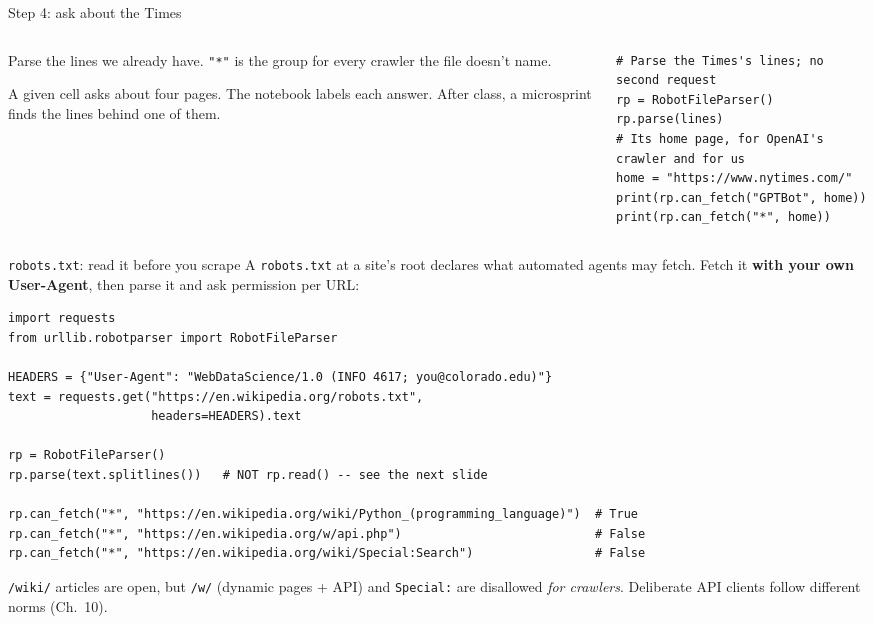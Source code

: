 \documentclass[9pt,aspectratio=169]{beamer}
\begin{document}
\begin{frame}[fragile]{Step 4: ask about the Times}
    \begin{columns}[T]
        \begin{column}{0.37\textwidth}
            Parse the lines we already have. \texttt{"*"} is the group for every crawler the file doesn't name.

            \medskip
            A given cell asks about four pages. The notebook labels each answer. After class, a microsprint finds the lines behind one of them.
        \end{column}
        \begin{column}{0.6\textwidth}
\begin{lstlisting}[basicstyle=\ttfamily\footnotesize]
# Parse the Times's lines; no second request
rp = RobotFileParser()
rp.parse(lines)
# Its home page, for OpenAI's crawler and for us
home = "https://www.nytimes.com/"
print(rp.can_fetch("GPTBot", home))
print(rp.can_fetch("*", home))
\end{lstlisting}
        \end{column}
    \end{columns}
\end{frame}

\begin{frame}[fragile]{\texttt{robots.txt}: read it before you scrape}
    A \texttt{robots.txt} at a site's root declares what automated agents may fetch. Fetch it \textbf{with your own User-Agent}, then parse it and ask permission per URL:
\begin{lstlisting}
import requests
from urllib.robotparser import RobotFileParser

HEADERS = {"User-Agent": "WebDataScience/1.0 (INFO 4617; you@colorado.edu)"}
text = requests.get("https://en.wikipedia.org/robots.txt",
                    headers=HEADERS).text

rp = RobotFileParser()
rp.parse(text.splitlines())   # NOT rp.read() -- see the next slide

rp.can_fetch("*", "https://en.wikipedia.org/wiki/Python_(programming_language)")  # True
rp.can_fetch("*", "https://en.wikipedia.org/w/api.php")                           # False
rp.can_fetch("*", "https://en.wikipedia.org/wiki/Special:Search")                 # False
\end{lstlisting}
    {\footnotesize \texttt{/wiki/} articles are open, but \texttt{/w/} (dynamic pages + API) and \texttt{Special:} are disallowed \textit{for crawlers}. Deliberate API clients follow different norms (Ch.~10).}
\end{frame}
\end{document}
